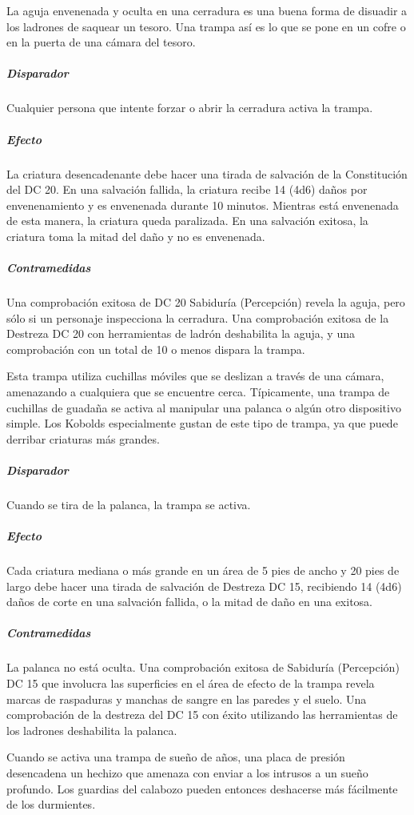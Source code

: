 \documentclass[a4paper,twocolumn,openany,10pt]{dndbook}
\begin{document}
La aguja envenenada y oculta en una cerradura es una buena forma de disuadir a los ladrones de saquear un tesoro. Una trampa así
es lo que se pone en un cofre o en la puerta de una cámara del tesoro.

\subparagraph{Disparador} Cualquier persona que intente forzar o abrir la cerradura activa la trampa.

\subparagraph{Efecto} La criatura desencadenante debe hacer una tirada de salvación de la Constitución del DC 20. En una
salvación fallida, la criatura recibe 14 (4d6) daños por envenenamiento y es envenenada durante 10 minutos. Mientras está
envenenada de esta manera, la criatura queda paralizada. En una salvación exitosa, la criatura toma la mitad del daño y no es
envenenada.

\subparagraph{Contramedidas} Una comprobación exitosa de DC 20 Sabiduría (Percepción) revela la aguja, pero sólo si un personaje
inspecciona la cerradura. Una comprobación exitosa de la Destreza DC 20 con herramientas de ladrón deshabilita la aguja, y una
comprobación con un total de 10 o menos dispara la trampa. 

Esta trampa utiliza cuchillas móviles que se deslizan a través de una cámara, amenazando a cualquiera que se encuentre cerca.
Típicamente, una trampa de cuchillas de guadaña se activa al manipular una palanca o algún otro dispositivo simple. Los Kobolds
especialmente gustan de este tipo de trampa, ya que puede derribar criaturas más grandes.

\subparagraph{Disparador} Cuando se tira de la palanca, la trampa se activa.

\subparagraph{Efecto} Cada criatura mediana o más grande en un área de 5 pies de ancho y 20 pies de largo debe hacer una tirada
de salvación de Destreza DC 15, recibiendo 14 (4d6) daños de corte en una salvación fallida, o la mitad de daño en una exitosa.

\subparagraph{Contramedidas} La palanca no está oculta. Una comprobación exitosa de Sabiduría (Percepción) DC 15 que involucra
las superficies en el área de efecto de la trampa revela marcas de raspaduras y manchas de sangre en las paredes y el suelo. Una
comprobación de la destreza del DC 15 con éxito utilizando las herramientas de los ladrones deshabilita la palanca. 

Cuando se activa una trampa de sueño de años, una placa de presión desencadena un hechizo que amenaza con enviar a los intrusos a
un sueño profundo. Los guardias del calabozo pueden entonces deshacerse más fácilmente de los durmientes.
\end{document}
